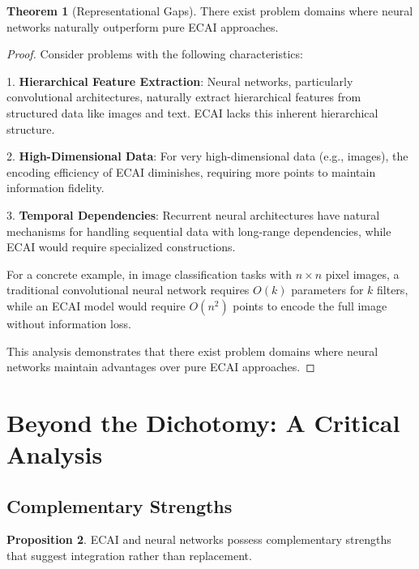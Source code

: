 \documentclass[12pt,a4paper]{article}
\theoremstyle{definition}
\newtheorem{theorem}{Theorem}
\newtheorem{proposition}[theorem]{Proposition}
\begin{document}
\begin{theorem}[Representational Gaps]
There exist problem domains where neural networks naturally outperform pure ECAI approaches.
\end{theorem}

\begin{proof}
Consider problems with the following characteristics:

1. \textbf{Hierarchical Feature Extraction}: Neural networks, particularly convolutional architectures, naturally extract hierarchical features from structured data like images and text. ECAI lacks this inherent hierarchical structure.

2. \textbf{High-Dimensional Data}: For very high-dimensional data (e.g., images), the encoding efficiency of ECAI diminishes, requiring more points to maintain information fidelity.

3. \textbf{Temporal Dependencies}: Recurrent neural architectures have natural mechanisms for handling sequential data with long-range dependencies, while ECAI would require specialized constructions.

For a concrete example, in image classification tasks with $n \times n$ pixel images, a traditional convolutional neural network requires $O(k)$ parameters for $k$ filters, while an ECAI model would require $O(n^2)$ points to encode the full image without information loss.

This analysis demonstrates that there exist problem domains where neural networks maintain advantages over pure ECAI approaches.
\end{proof}

\section{Beyond the Dichotomy: A Critical Analysis}

\subsection{Complementary Strengths}

\begin{proposition}
ECAI and neural networks possess complementary strengths that suggest integration rather than replacement.
\end{proposition}
\end{document}
